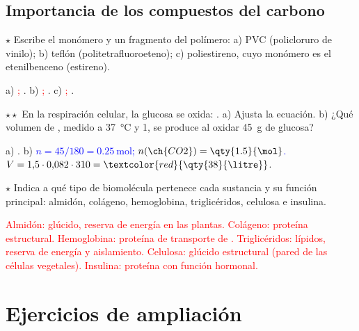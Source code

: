 \subsection{Importancia de los compuestos del carbono}

\begin{exercise}
    \(\star\) Escribe el monómero y un fragmento del polímero: a) PVC (policloruro de vinilo); b) teflón (politetrafluoroeteno);
    c) poliestireno, cuyo monómero es el etenilbenceno (estireno).
    \begin{solu}
        a) \textcolor{red}{; }. b) \textcolor{red}{; }.
        c) \textcolor{red}{; }.
    \end{solu}
\end{exercise}

\begin{exercise}
    \(\star\star\) En la respiración celular, la glucosa se oxida: . a) Ajusta la ecuación.
    b) ¿Qué volumen de , medido a \qty{37}{\degreeCelsius} y \qty{1}{\atm}, se produce al oxidar \qty{45}{\gram} de glucosa?
    \begin{solu}
        a) \textcolor{red}{}. b) \textcolor{blue}{\(n = 45/180 = \qty{0.25}{\mol}\);
        \(n(\ch{CO2}) = \qty{1.5}{\mol}\).} \(V = 1{,}5 \cdot 0{,}082 \cdot 310 = \textcolor{red}{\qty{38}{\litre}}\).
    \end{solu}
\end{exercise}

\begin{exercise}
    \(\star\) Indica a qué tipo de biomolécula pertenece cada sustancia y su función principal: almidón, colágeno, hemoglobina,
    triglicéridos, celulosa e insulina.
    \begin{solu}
        \textcolor{red}{Almidón: glúcido, reserva de energía en las plantas. Colágeno: proteína estructural. Hemoglobina: proteína
        de transporte de . Triglicéridos: lípidos, reserva de energía y aislamiento. Celulosa: glúcido estructural (pared
        de las células vegetales). Insulina: proteína con función hormonal.}
    \end{solu}
\end{exercise}

\section{Ejercicios de ampliación}\label{sec:ud7-ampliacion}

